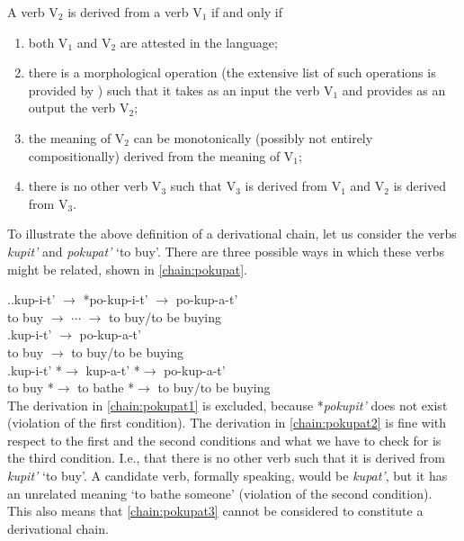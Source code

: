 \begin{definition}\label{def:history}
A verb V$_2$ is derived from a verb V$_1$ if and only if
\begin{enumerate}
\item both V$_1$ and V$_2$ are attested in the language;
\item there is a morphological operation (the extensive list of such operations is provided by \citealt{Shvedova:82}) such that it takes as an input the verb V$_1$ and provides as an output the verb V$_2$;
\item the meaning of V$_2$ can be monotonically (possibly not entirely compositionally) derived from the meaning of V$_1$;
\item there is no other verb V$_3$ such that V$_3$ is derived from V$_1$ and V$_2$ is derived from V$_3$.
\end{enumerate}
\end{definition}

To illustrate the above definition of a derivational chain, let us consider the verbs \textit{kupit'\textsuperscript{\PF}} and \textit{pokupat'\textsuperscript{\IPF}} `to buy'. There are three possible ways in which these verbs might be related, shown in \ref{chain:pokupat}.

\ex.\label{chain:pokupat}\ag.\label{chain:pokupat1}kup-i-t'\textsuperscript{\PF} $\rightarrow$ *po-kup-i-t' $\rightarrow$ po-kup-a-t'\textsuperscript{\IPF}\\	
{to buy} $\rightarrow$ $\cdots$ $\rightarrow$ {to buy/to be buying}\\
\bg.\label{chain:pokupat2}kup-i-t'\textsuperscript{\PF} $\rightarrow$ po-kup-a-t'\textsuperscript{\IPF}\\
{to buy} $\rightarrow$ {to buy/to be buying}\\
\bg.\label{chain:pokupat3}kup-i-t'\textsuperscript{\PF} *$\rightarrow$ kup-a-t'\textsuperscript{\IPF} *$\rightarrow$ po-kup-a-t'\textsuperscript{\IPF}\\
{to buy} *$\rightarrow$ {to bathe} *$\rightarrow$ {to buy/to be buying}\\

The derivation in \ref{chain:pokupat1} is excluded, because *\textit{pokupit'} does not exist (violation of the first condition). The derivation in \ref{chain:pokupat2} is fine with respect to the first and the second conditions and what we have to check for is the third condition. I.e., that there is no other verb such that it is derived from \textit{kupit'}\textsuperscript{\PF} `to buy'.  A candidate verb, formally speaking, would be \textit{kupat'\textsuperscript{\IPF}}, but it has an unrelated meaning `to bathe someone' (violation of the second condition). This also means that \ref{chain:pokupat3} cannot be considered to constitute a derivational chain.  

